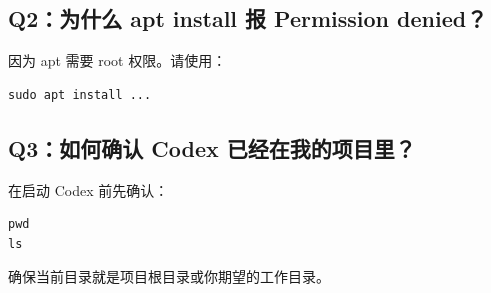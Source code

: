 \documentclass[11pt,a4paper]{article}
\begin{document}
\subsection*{Q2：为什么 apt install 报 Permission denied？}
因为 apt 需要 root 权限。请使用：
\begin{lstlisting}
sudo apt install ...
\end{lstlisting}

\subsection*{Q3：如何确认 Codex 已经在我的项目里？}
在启动 Codex 前先确认：
\begin{lstlisting}
pwd
ls
\end{lstlisting}
确保当前目录就是项目根目录或你期望的工作目录。
\end{document}
